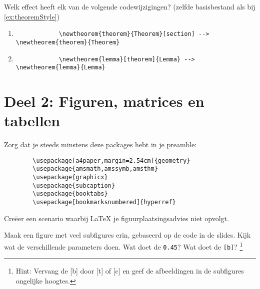 \documentclass[a4paper]{article}
\begin{document}
\begin{exercise}[Theorem nummering]%
    Welk effect heeft elk van de volgende codewijzigingen? (zelfde basisbestand als bij \autoref{ex:theoremStyle})
    \begin{enumerate}[label=\alph*)]
        \item \begin{verbatim}
            \newtheorem{theorem}{Theorem}[section] --> \newtheorem{theorem}{Theorem}
        \end{verbatim}
        \item \begin{verbatim}
            \newtheorem{lemma}[theorem]{Lemma} --> \newtheorem{lemma}{Lemma}
        \end{verbatim}
    \end{enumerate}
\end{exercise}

\section{Deel 2: Figuren, matrices en tabellen}

Zorg dat je steeds minstens deze packages hebt in je preamble:
\begin{verbatim}
        \usepackage[a4paper,margin=2.54cm]{geometry}
        \usepackage{amsmath,amssymb,amsthm}
        \usepackage{graphicx}
        \usepackage{subcaption}
        \usepackage{booktabs}
        \usepackage[bookmarksnumbered]{hyperref}
    \end{verbatim}
\bigskip


\begin{exercise}[Figuurplaatsing]
    Cre\"eer een scenario waarbij \LaTeX{} je figuurplaatsingsadvies niet opvolgt.
\end{exercise}

\begin{exercise}[Subfigure]
    Maak een figure met veel subfigures erin, gebaseerd op de code in de slides. Kijk wat de verschillende parameters
    doen. Wat doet de \texttt{0.45\textwidth}? Wat doet de \texttt{[b]}?%
    \footnote{Hint: Vervang de [b] door [t] of [c] en geef de afbeeldingen in de subfigures
        ongelijke hoogtes.}
\end{exercise}
\end{document}
